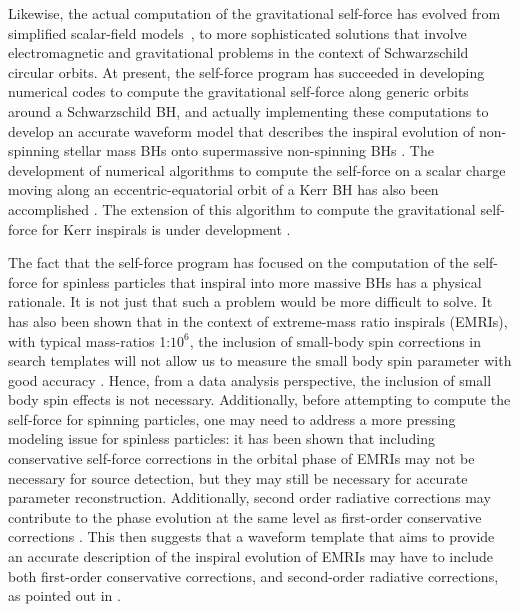 Likewise, the actual computation of the gravitational self-force has evolved from  simplified scalar-field models~\cite{scasf}, to more sophisticated solutions that involve electromagnetic and gravitational problems in the context  of Schwarzschild circular orbits. At present, the self-force program has succeeded in developing numerical codes to compute the gravitational self-force along generic orbits around a Schwarzschild BH, and actually implementing these computations to develop an accurate waveform model that describes the inspiral evolution of non-spinning stellar mass BHs onto supermassive non-spinning BHs \cite{wargar}. The development of numerical algorithms to compute the self-force on a scalar charge moving along an eccentric-equatorial orbit of a Kerr BH has also been accomplished \cite{war}. The extension of this algorithm to compute the gravitational self-force for Kerr inspirals is under development  \cite{war,warleor}. 

The fact that the self-force program has focused on the computation of the self-force for spinless particles that inspiral into more massive BHs has a physical rationale. It is not just that such a problem would be more difficult to solve. It has also been shown that in the context of extreme-mass ratio inspirals (EMRIs), with typical mass-ratios 1:\(10^{6}\), the inclusion of small-body spin corrections in search templates will not allow us to measure the small body spin parameter with good accuracy  \cite{smallbody}. Hence, from a data analysis perspective, the inclusion of small body spin effects is not necessary.  Additionally, before attempting to compute the self-force for spinning particles, one may need to address a more pressing modeling issue for spinless particles: it has been shown that including conservative self-force corrections in the orbital phase of EMRIs may not be necessary for source detection, but they may still be necessary for accurate parameter reconstruction. Additionally, second 
order radiative corrections may contribute to the phase evolution at the same level as first-order conservative corrections \cite{cons,conspro}.  This then suggests that a waveform template that aims to provide an accurate description of the inspiral evolution of EMRIs may have to include both first-order conservative corrections, and second-order radiative corrections, as pointed out in \cite{wargar}. 


